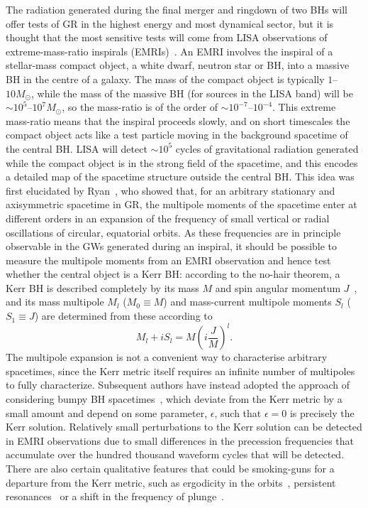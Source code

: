 \documentclass[aps,prd,amsfonts,amssymb,amsmath,nofootinbib,reprint,showpacs]{revtex4-1}
\begin{document}
The radiation generated during the final merger and ringdown of two BHs will offer tests of GR in the highest energy and most dynamical sector, but it is thought that the most sensitive tests will come from LISA observations of extreme-mass-ratio inspirals (EMRIs)~\cite{Amaro-Seoane2007}. An EMRI involves the inspiral of a stellar-mass compact object, a white dwarf, neutron star or BH, into a massive BH in the centre of a galaxy. The mass of the compact object is typically $1$--$10M_{\odot}$, while the mass of the massive BH (for sources in the LISA band) will be $\sim10^5$--$10^7 M_\odot$, so the mass-ratio is of the order of $\sim10^{-7}$--$10^{-4}$. This extreme mass-ratio means that the inspiral proceeds slowly, and on short timescales the compact object acts like a test particle moving in the background spacetime of the central BH. LISA will detect $\sim10^5$ cycles of gravitational radiation generated while the compact object is in the strong field of the spacetime, and this encodes a detailed map of the spacetime structure outside the central BH. This idea was first elucidated by Ryan~\cite{Ryan1995c, Ryan1997a}, who showed that, for an arbitrary stationary and axisymmetric spacetime in GR, the multipole moments of the spacetime enter at different orders in an expansion of the frequency of small vertical or radial oscillations of circular, equatorial orbits. As these frequencies are in principle observable in the GWs generated during an inspiral, it should be possible to measure the multipole moments from an EMRI observation and hence test whether the central object is a Kerr BH: according to the no-hair theorem, a Kerr BH is described completely by its mass $M$ and spin angular momentum $J$~\cite{Israel1967, Israel1968, Carter1971, Hawking1972, Robinson1975}, and its mass multipole $M_l$ ($M_0 \equiv M$) and mass-current multipole moments $S_l$ ($S_1 \equiv J$) are determined from these according to~\cite{Hansen1974}
\begin{equation}
M_l + iS_l = M \left(i\frac{J}{M}\right)^l .
\end{equation}
The multipole expansion is not a convenient way to characterise arbitrary spacetimes, since the Kerr metric itself requires an infinite number of multipoles to fully characterize. Subsequent authors have instead adopted the approach of considering bumpy BH spacetimes~\cite{Collins2004, Glampedakis2006a, Barack2007, Gair2008a}, which deviate from the Kerr metric by a small amount and depend on some parameter, $\epsilon$, such that $\epsilon = 0$ is precisely the Kerr solution. Relatively small perturbations to the Kerr solution can be detected in EMRI observations due to small differences in the precession frequencies that accumulate over the hundred thousand waveform cycles that will be detected. There are also certain qualitative features that could be smoking-guns for a departure from the Kerr metric, such as ergodicity in the orbits~\cite{Gair2008a}, persistent resonances~\cite{Lukes-Gerakopoulos2010} or a shift in the frequency of plunge~\cite{Kesden2005, Gair2008a}.
\end{document}
